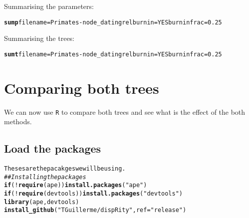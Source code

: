 \documentclass{article}\usepackage[]{graphicx}\usepackage[]{color}
\makeatletter
\newcommand{\hlstr}[1]{\textcolor[rgb]{0.192,0.494,0.8}{#1}}%
\newcommand{\hlcom}[1]{\textcolor[rgb]{0.678,0.584,0.686}{\textit{#1}}}%
\newcommand{\hlkwd}[1]{\textcolor[rgb]{0.737,0.353,0.396}{\textbf{#1}}}%
\newenvironment{kframe}{%
 \def\at@end@of@kframe{}%
 \ifinner\ifhmode%
  \def\at@end@of@kframe{\end{minipage}}%
  \begin{minipage}{\columnwidth}%
 \fi\fi%
 \def\FrameCommand##1{\hskip\@totalleftmargin \hskip-\fboxsep
 \colorbox{shadecolor}{##1}\hskip-\fboxsep
     \hskip-\linewidth \hskip-\@totalleftmargin \hskip\columnwidth}%
 \MakeFramed {\advance\hsize-\width
   \@totalleftmargin\z@ \linewidth\hsize
   \@setminipage}}%
 {\par\unskip\endMakeFramed%
 \at@end@of@kframe}
\newenvironment{knitrout}{}{} %
\makeatother
\begin{document}
Summarising the parameters:
\begin{knitrout}
\color{fgcolor}\begin{kframe}
\begin{alltt}
\hlkwd{sump} filename=\hlstr{Primates-node_dating} relburnin=\hlstr{YES} burninfrac=\hlstr{0.25}
\end{alltt}
\end{kframe}
\end{knitrout}

\noindent Summarising the trees:
\begin{knitrout}
\color{fgcolor}\begin{kframe}
\begin{alltt}
\hlkwd{sumt} filename=\hlstr{Primates-node_dating} relburnin=\hlstr{YES} burninfrac=\hlstr{0.25}
\end{alltt}
\end{kframe}
\end{knitrout}

\section{Comparing both trees}
We can now use \texttt{R} to compare both trees and see what is the effect of the both methods.

\subsection{Load the packages}
\begin{knitrout}
\color{fgcolor}\begin{kframe}
\begin{alltt}
Theses are the pacakges we will be using.
\hlcom{## Installing the packages}
\hlkwd{if}(!\hlkwd{require}(ape)) \hlkwd{install.packages}(\hlstr{"ape"})
\hlkwd{if}(!\hlkwd{require}(devtools)) \hlkwd{install.packages}(\hlstr{"devtools"})
\hlkwd{library}(ape, devtools)
\hlkwd{install_github}(\hlstr{"TGuillerme/dispRity"}, ref = \hlstr{"release"})
\end{alltt}
\end{kframe}
\end{knitrout}
\end{document}
